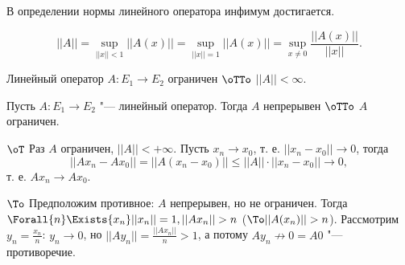\documentclass[main]{subfiles}
\begin{document}
\begin{exercise}
  В определении нормы линейного оператора инфимум достигается.
\end{exercise}

\begin{lemma}
  \[ ||A|| = \sup_{||x|| < 1} ||A(x)|| = \sup_{||x|| = 1} ||A(x)|| =
  \sup_{x \ne 0} \frac{||A(x)||}{||x||}. \]
\end{lemma}
\begin{corollary}
  Линейный оператор \( A : E_1 \to E_2 \)
  ограничен \( \oTTo \) \( ||A|| < \infty \).
\end{corollary}

\begin{theorem}
  Пусть \( A : E_1 \to E_2 \) "---
  линейный оператор. Тогда \( A \) непрерывен \( \oTTo \)
  \( A \) ограничен.
\end{theorem}
\begin{itemproof}
  \item[\(\oT\)]
    Раз \( A \) ограничен, \( ||A|| < +\infty \).
    Пусть \( x_n \to x_0 \), т. е. \( ||x_n - x_0|| \to 0 \),
    тогда
    \[
      ||A x_n - A x_0|| = ||A(x_n - x_0)|| \le ||A|| \cdot ||x_n - x_0|| \to 0,
    \]
    т. е. \( A x_n \to A x_0 \).
  \item[$\To$]
    Предположим противное: \( A \) непрерывен, но не ограничен.
    Тогда \( \Forall{n} \Exists{x_n} ||x_n|| = 1, ||A x_n|| > n \)
    (\( \To ||A(x_n)|| > n \)).
    Рассмотрим \( y_n = \frac{x_n}{n} \):
    \( y_n \to 0 \), но \( ||A y_n|| = \frac{||A x_n||}{n} > 1 \),
    а потому \( A y_n \not \to 0 = A 0 \) "--- противоречие.
\end{itemproof}
\end{document}
